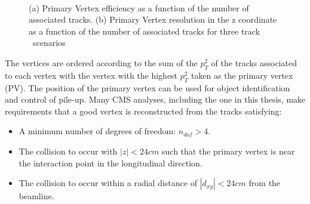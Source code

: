\begin{figure}[hbt]
  \begin{center} 
   ~
   \caption{(a) Primary Vertex efficiency as a function of the number of associated tracks. (b) Primary Vertex 
   resolution in the z coordinate as a function of the number of associated tracks for three track \pt~scenarios~\cite{tracker_seven}
   \label{fig:pvEffRes} }
  \end{center}
\end{figure}

The vertices are ordered according to the sum of the $p_T^2$ of the tracks associated to each vertex with the 
vertex with the highest $p_T^2$ taken as the primary vertex (PV). The position of the primary vertex can
be used for object identification and control of pile-up. Many CMS analyses, including the one in this 
thesis, make requirements that a good vertex is reconstructed from the tracks satisfying:

\begin{itemize}
\item A minimum number of degrees of freedom: $n_{dof} > 4$.
\item The collision to occur with $|z| < 24cm$ such that the primary vertex is near the 
interaction point in the longitudinal direction.
\item The collision to occur within a radial distance of $|d_{xy}| < 24cm$ from the beamline.
\end{itemize}

